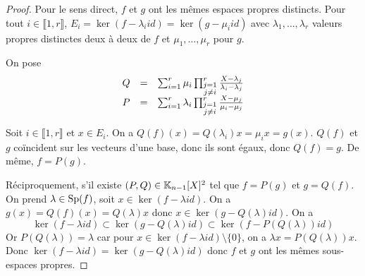 \documentclass[12pt]{article}
\begin{document}
\begin{proof}
	Pour le sens direct, $f$ et $g$ ont les mêmes espaces propres distincts. Pour tout $i\in\llbracket1,r\rrbracket$, $E_{i}=\ker(f-\lambda_{i}id)=\ker(g-\mu_{i}id)$ avec $\lambda_{1},\dots,\lambda_{r}$ valeurs propres distinctes deux à deux de $f$ et $\mu_{1},\dots,\mu_{r}$ pour $g$.

	On pose 
	\begin{equation}
		\begin{array}[]{lll}
			Q&=&\sum_{i=1}^{r}\mu_{i}\prod_{\substack{j=1\\ j\neq i}}^{r}\frac{X-\lambda_{j}}{\lambda_{i}-\lambda_{j}}\\
			P&=&\sum_{i=1}^{r}\lambda_{i}\prod_{\substack{j=1\\ j\neq i}}^{r}\frac{X-\mu_{j}}{\mu_{i}-\mu_{j}}
		\end{array}
	\end{equation}

	Soit $i\in\llbracket1,r\rrbracket$ et $x\in E_{i}$. On a $Q(f)(x)=Q(\lambda_{i})x=\mu_{i}x=g(x)$. $Q(f)$ et $g$ coïncident sur les vecteurs d'une base, donc ils sont égaux, donc $Q(f)=g$. De même, $f=P(g)$.

	Réciproquement, s'il existe $(P,Q)\in\mathbb{K}_{n-1}[X]^{2}$ tel que $f=P(g)$ et $g=Q(f)$. On prend $\lambda\in\operatorname{Sp}(f)$, soit $x\in\ker(f-\lambda id)$. On a $g(x)=Q(f)(x)=Q(\lambda)x$ donc $x\in\ker(g-Q(\lambda)id)$. On a 
	\begin{equation}
		\ker(f-\lambda id)\subset\ker(g-Q(\lambda)id)\subset\ker(f-P(Q(\lambda))id)
	\end{equation}
	Or $P(Q(\lambda))=\lambda$ car pour $x\in\ker(f-\lambda id)\setminus\lbrace0\rbrace$, on a $\lambda x=P(Q(\lambda))x$. Donc $\ker(f-\lambda id)=\ker(g-Q(\lambda)id)$ donc $f$ et $g$ ont les mêmes sous-espaces propres.
\end{proof}
\end{document}
